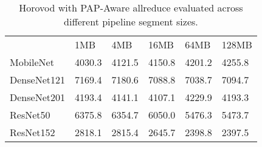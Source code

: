 \begin{table}
    \centering
    \caption[PAP-Aware Horovod Results With Different Pipeline Segment Sizes]{Horovod with PAP-Aware allreduce evaluated across different pipeline segment sizes.}
    \begin{tabular}{llllll}
                & 1MB    & 4MB    & 16MB   & 64MB   & 128MB  \\
    MobileNet   & 4030.3 & 4121.5 & 4150.8 & 4201.2 & 4255.8 \\
    DenseNet121 & 7169.4 & 7180.6 & 7088.8 & 7038.7 & 7094.7 \\
    DenseNet201 & 4193.4 & 4141.1 & 4107.1 & 4229.9 & 4193.3 \\
    ResNet50    & 6375.8 & 6354.7 & 6050.0 & 5476.3 & 5473.7 \\
    ResNet152   & 2818.1 & 2815.4 & 2645.7 & 2398.8 & 2397.5 \\
    \end{tabular}
    \label{tbl:pap_hvd_narval_shift_seg}
\end{table}